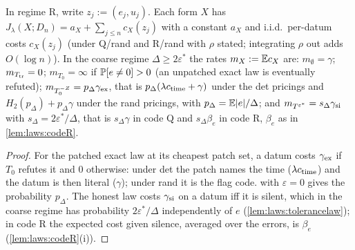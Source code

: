 \begin{proposition}[Rates]\label{prop:laws:rates}
In regime R, write $z_j:=(e_j,u_j)$. Each form $X$ has $J_\lambda(X;D_n)=a_X+\sum_{j\le n}c_X(z_j)$ with a constant $a_X$ and i.i.d.\ per-datum costs $c_X(z_j)$ (under Q/rand and R/rand with $\rho$ stated; integrating $\rho$ out adds $O(\log n)$). In the coarse regime $\Delta\ge2\varepsilon^*$ the rates $m_X:=\mathbb{E} c_X$ are: $m_\emptyset=\gamma$; $m_{T_{\rm tr}}=0$; $m_{T_0}=\infty$ if $\mathbb{P}[e\ne0]>0$ (an unpatched exact law is eventually refuted); $m_{T_0^{-Z}}=p_\Delta\gamma_{\rm ex}$, that is $p_\Delta(\lambda c_{\rm time}+\gamma)$ under the det pricings and $H_2(p_\Delta)+p_\Delta\gamma$ under the rand pricings, with $p_\Delta=\mathbb{E}\lvert e\rvert/\Delta$; and $m_{T^{\varepsilon^*}}=s_\Delta\gamma_{\rm si}$ with $s_\Delta=2\varepsilon^*/\Delta$, that is $s_\Delta\gamma$ in code Q and $s_\Delta\beta_e$ in code R, $\beta_e$ as in \cref{lem:laws:codeR}.
\end{proposition}

\begin{proof}
For the patched exact law at its cheapest patch set, a datum costs $\gamma_{\rm ex}$ if $T_0$ refutes it and $0$ otherwise: under det the patch names the time ($\lambda c_{\rm time}$) and the datum is then literal ($\gamma$); under rand it is the flag code.  with $\varepsilon=0$ gives the probability $p_\Delta$. The honest law costs $\gamma_{\rm si}$ on a datum iff it is silent, which in the coarse regime has probability $2\varepsilon^*/\Delta$ independently of $e$ (\cref{lem:laws:tolerancelaw}); in code R the expected cost given silence, averaged over the errors, is $\beta_e$ (\cref{lem:laws:codeR}(i)).
\end{proof}

